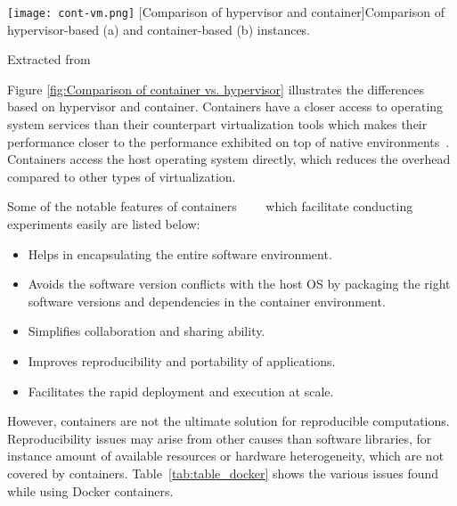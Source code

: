 \begin{center}
\texttt{[image: cont-vm.png]}
  [Comparison of hypervisor and container]{Comparison of hypervisor-based (a) and container-based (b) instances.}
\label{fig:Comparison of container vs. hypervisor}
\caption*{Extracted from \cite{7382987}}
\end{center}

Figure \ref{fig:Comparison of container vs. hypervisor} illustrates the differences based on hypervisor and container. Containers have a closer access to operating system services than their counterpart virtualization tools which makes their performance closer to the performance exhibited on top of native environments~\cite{Xavier:2013:PEC:2497369.2497577}. Containers access the host operating system directly, which reduces the overhead compared to other types of virtualization.

Some of the notable features of containers~\cite{docker-run}~\cite{DBLP:journals/corr/HaleLRW16}~\cite{Julian:2016:CRI:2949550.2949562}~\cite{10.1109/ISPASS.2015.7095802} which facilitate conducting experiments easily are listed below:

\begin{itemize}
  \item Helps in encapsulating the entire software environment.
  \item Avoids the software version conflicts with the host OS by packaging the right software versions and dependencies in the container environment.
  \item Simplifies collaboration and sharing ability.
  \item Improves reproducibility and portability of applications.
  \item Facilitates the rapid deployment and execution at scale.
\end{itemize}


However, containers are not the ultimate solution for reproducible computations. Reproducibility issues may arise from other causes than software libraries, for instance amount of available resources or hardware heterogeneity, which are not covered by containers. Table~\ref{tab:table_docker} shows the various issues found while using Docker containers.

